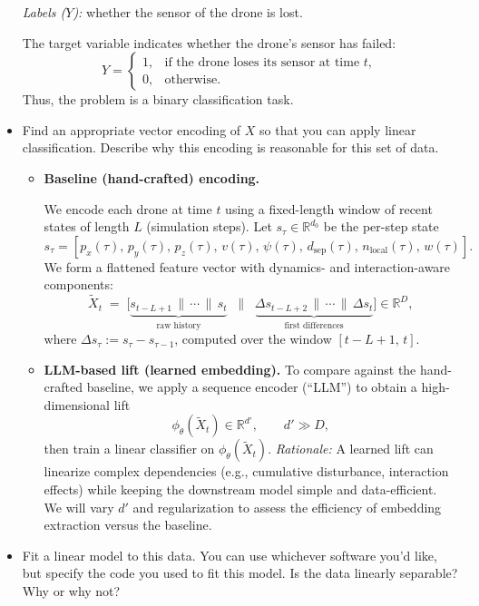 \documentclass[a4paper]{article}
\begin{document}
\begin{itemize}
\emph{Labels ($Y$):} whether the sensor of the drone is lost.

The target variable indicates whether the drone’s sensor has failed:
\[
Y = 
\begin{cases}
1, & \text{if the drone loses its sensor at time } t, \\
0, & \text{otherwise.}
\end{cases}
\]
Thus, the problem is a binary classification task.

    \item Find an appropriate vector encoding of $X$ so that you can apply linear classification.
        Describe why this encoding is reasonable for this set of data.

        \begin{itemize}
            \item \textbf{Baseline (hand-crafted) encoding.}

We encode each drone at time $t$ using a fixed-length window of recent states of length $L$ (simulation steps). 
Let $s_\tau \in \mathbb{R}^{d_0}$ be the per-step state
$$s_\tau = [p_x(\tau),\, p_y(\tau),\, p_z(\tau),\, v(\tau),\, \psi(\tau),\, d_{\text{sep}}(\tau),\, n_{\text{local}}(\tau),\, w(\tau)].$$
We form a flattened feature vector with dynamics- and interaction-aware components:
{\small $$\tilde{X}_t \;=\;
\Big[
\underbrace{s_{t-L+1}\,\|\,\cdots\,\|\,s_t}_{\text{raw history}}
\;\;\| \;\;
\underbrace{\Delta s_{t-L+2}\,\|\,\cdots\,\|\,\Delta s_t}_{\text{first differences}}
\Big] \in \mathbb{R}^{D},
$$}
where $\Delta s_\tau := s_\tau - s_{\tau-1}$,
computed over the window $[t\!-\!L\!+\!1,\,t]$.
            \item \textbf{LLM-based lift (learned embedding).}
                To compare against the hand-crafted baseline, we apply a sequence encoder (``LLM'') to obtain a high-dimensional lift
                \[
                    \phi_\theta(\tilde{X}_t)\in\mathbb{R}^{d'},\qquad d'\gg D,
                \]
                then train a linear classifier on $\phi_\theta(\tilde{X}_t)$.  
                \emph{Rationale:} A learned lift can linearize complex dependencies (e.g., cumulative disturbance, interaction effects) while keeping the downstream model simple and data-efficient. We will vary $d'$ and regularization to assess the efficiency of embedding extraction versus the baseline.
        \end{itemize}


    \item Fit a linear model to this data. You can use whichever software you’d like, but specify the code you used to fit this model. Is the data linearly separable? Why or why not?


\end{itemize}
\end{document}
